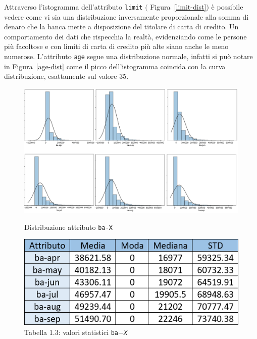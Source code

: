 Attraverso l'istogramma dell'attributo \texttt{limit} $($ Figura~\ref{limit-dist}$)$ è possibile vedere come vi sia una distribuzione inversamente proporzionale alla somma di denaro che la banca mette a disposizione del titolare di carta di credito. Un comportamento dei dati che rispecchia la realtà, evidenziando come le persone più facoltose e con limiti di carta di credito più alte siano anche le meno numerose. L'attributo \texttt{age} segue una distribuzione normale, infatti si può notare in Figura~\ref{age-dist} come il picco dell'istogramma coincida con la curva distribuzione, esattamente sul valore 35.

\begin{figure}[!htb]
  \includegraphics[width=\linewidth]{img/ba-distribution.png}
  \caption{Distribuzione attributo \texttt{ba-X}}\label{ba-dist}
\endminipage\hfill
{}
  \includegraphics[width=\linewidth]{img/ba-stat.png}
\captionsetup{labelformat=empty}
\caption{Tabella 1.3: valori statistici \texttt{ba$-$\textit{X}}}
\label{ba-stat}
\endminipage\hfill
\end{figure}

